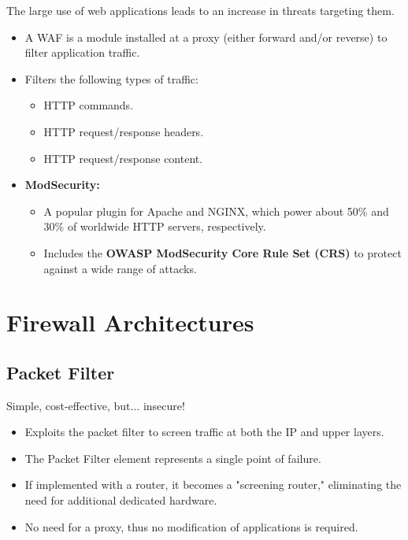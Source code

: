 The large use of web applications leads to an increase in threats targeting them.
\begin{itemize}
    \item A WAF is a module installed at a proxy (either forward and/or reverse) to filter application traffic.
    \item Filters the following types of traffic:
    \begin{itemize}
        \item HTTP commands.
        \item HTTP request/response headers.
        \item HTTP request/response content.
    \end{itemize}
    \item \textbf{ModSecurity:}
    \begin{itemize}
        \item A popular plugin for Apache and NGINX, which power about 50\% and 30\% of worldwide HTTP servers, respectively.
        \item Includes the \textbf{OWASP ModSecurity Core Rule Set (CRS)} to protect against a wide range of attacks.
    \end{itemize}
\end{itemize}

\section{Firewall Architectures}
\subsection{Packet Filter}

\begin{tcolorbox}[colback=red!10!white, colframe=red!70!black, coltitle=white, title=Beware]
    Simple, cost-effective, but... insecure!
\end{tcolorbox}

\begin{itemize}
    \item Exploits the packet filter to screen traffic at both the IP and upper layers.
    \item The Packet Filter element represents a single point of failure.
    \item If implemented with a router, it becomes a "screening router," eliminating the need for additional dedicated hardware.
    \item No need for a proxy, thus no modification of applications is required.
\end{itemize}

